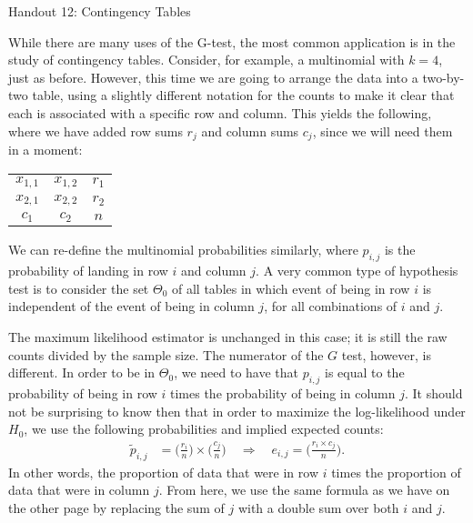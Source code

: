 \documentclass{tufte-handout}
\begin{document}
\justify

{\LARGE Handout 12: Contingency Tables}

\vspace*{18pt}

\noindent
While there are many uses of the G-test, the most common application 
is in the study of contingency tables. Consider, for example, a multinomial
with $k=4$, just as before. However, this time we are going to arrange
the data into a two-by-two table, using a slightly different notation for
the counts to make it clear that each is associated with a specific row
and column. This yields the following, where we have added row sums $r_j$
and column sums $c_j$, since we will need them in a moment: 
\begin{center}
\begin{tabular}{*3c}
\cline{1-2}
  \multicolumn{1}{|c|}{$x_{1,1}$} &
  \multicolumn{1}{|c|}{$x_{1,2}$} &
  \multicolumn{1}{|c}{$r_1$} \\  
\cline{1-2}
  \multicolumn{1}{|c|}{$x_{2,1}$} &
  \multicolumn{1}{|c|}{$x_{2,2}$} &
  \multicolumn{1}{|c}{$r_2$} \\ 
\cline{1-2}
  \multicolumn{1}{c}{$c_1$}
  & \multicolumn{1}{c}{$c_2$}
  & \multicolumn{1}{c}{$n$}
\end{tabular}
\end{center}
We can re-define the multinomial probabilities similarly, where $p_{i,j}$
is the probability of landing in row $i$ and column $j$. A very common
type of hypothesis test is to consider the set $\Theta_0$ of all tables
in which event of being in row $i$ is independent of the event of being
in column $j$, for all combinations of $i$ and $j$.

The maximum likelihood estimator is unchanged in this case; it is still
the raw counts divided by the sample size. The numerator of the $G$ test,
however, is different. In order to be in $\Theta_0$, we need to have that
$p_{i,j}$ is equal to the probability of being in row $i$ times the probability
of being in column $j$. It should not be surprising to know then that in
order to maximize the log-likelihood under $H_0$, we use the following
probabilities and implied expected counts:
\begin{align*}
\tilde{p}_{i,j} &= \biggl(\frac{r_i}{n}\biggl) \times \biggl(\frac{c_j}{n}\biggl)
\quad \Rightarrow \quad 
e_{i,j} = \biggl(\frac{r_i \times c_j}{n}\biggl).
\end{align*}
In other words, the proportion of data that were in row $i$ times the
proportion of data that were in column $j$. From here, we use the same
formula as we have on the other page by replacing the sum of $j$ with a
double sum over both $i$ and $j$.
\end{document}

